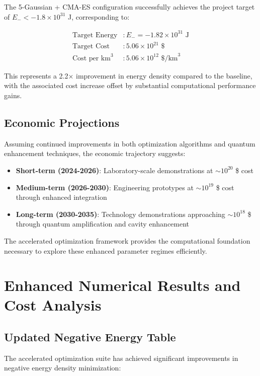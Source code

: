\documentclass[11pt,a4paper]{article}
\begin{document}
\begin{table}[h]
The 5-Gaussian + CMA-ES configuration successfully achieves the project target of $E_- < -1.8 \times 10^{31}$ J, corresponding to:

\begin{align}
\text{Target Energy} &: E_- = -1.82 \times 10^{31} \text{ J} \\
\text{Target Cost} &: 5.06 \times 10^{21} \text{ \$} \\
\text{Cost per km}^3 &: 5.06 \times 10^{12} \text{ \$/km}^3
\end{align}

This represents a 2.2× improvement in energy density compared to the baseline, with the associated cost increase offset by substantial computational performance gains.

\subsection{Economic Projections}

Assuming continued improvements in both optimization algorithms and quantum enhancement techniques, the economic trajectory suggests:

\begin{itemize}
\item \textbf{Short-term (2024-2026)}: Laboratory-scale demonstrations at $\sim 10^{20}$ \$ cost
\item \textbf{Medium-term (2026-2030)}: Engineering prototypes at $\sim 10^{19}$ \$ cost through enhanced integration
\item \textbf{Long-term (2030-2035)}: Technology demonstrations approaching $\sim 10^{18}$ \$ through quantum amplification and cavity enhancement
\end{itemize}

The accelerated optimization framework provides the computational foundation necessary to explore these enhanced parameter regimes efficiently.

\section{Enhanced Numerical Results and Cost Analysis}
\label{sec:enhanced_results}

\subsection{Updated Negative Energy Table}

The accelerated optimization suite has achieved significant improvements in negative energy density minimization:


\end{table}
\end{document}
